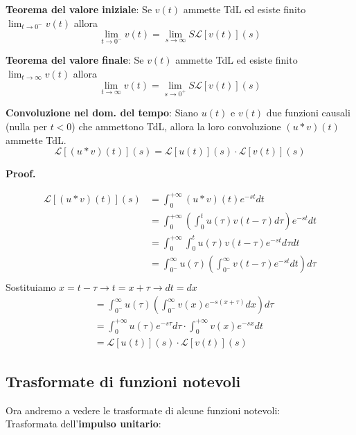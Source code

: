 \documentclass[a4paper]{article}
\newtheorem{theorem}{Theorem}[section]    %
\newtheorem{property}[theorem]{Propriety}
\theoremstyle{definition}
\theoremstyle{remark}
\renewenvironment{proof}[1][Proof]{%
  \begin{mdframed}[linewidth=0.8pt, roundcorner=5pt, linecolor=black, skipabove=\baselineskip, skipbelow=\baselineskip, innertopmargin=5pt, innerbottommargin=5pt]%
  \noindent\textbf{#1. }%
}{%
  \end{mdframed}%
}
\renewenvironment{theorem}{\begin{thmbox}\begin{oldtheorem}}{\end{oldtheorem}\end{thmbox}}
\renewenvironment{property}{\begin{oldproperty}}{\end{oldproperty}}
\begin{document}
\begin{theorem}
    \label{thm:val_iniziale_lap} \textbf{Teorema del valore iniziale}:
    Se $v(t)$ ammette TdL ed esiste finito $\lim_{t \rightarrow 0^-}v(t)$ allora 
    \[\lim_{t \rightarrow 0^-} v(t) = \lim_{s \rightarrow \infty} S\mathcal{L}[v(t)](s)\]
\end{theorem}
\begin{theorem}
    \label{thm:val_finale_lap} \textbf{Teorema del valore finale}:
    Se $v(t)$ ammette TdL ed esiste finito $\lim_{t \rightarrow \infty}v(t)$ allora 
    \[\lim_{t \rightarrow \infty} v(t) = \lim_{s \rightarrow 0^+} S\mathcal{L}[v(t)](s)\]
\end{theorem}
\begin{property}
    \textbf{Convoluzione nel dom. del tempo}: Siano $u(t)$ e $v(t)$ due funzioni causali (nulla per $t<0$) che ammettono TdL, allora la loro convoluzione $(u \ast v)(t)$ ammette TdL. 
    \[\mathcal{L}[(u \ast v)(t)](s) = \mathcal{L}[u(t)](s) \cdot \mathcal{L}[v(t)](s)\]
\end{property}
\begin{proof}
    \begin{align*}
        \mathcal{L}[(u \ast v)(t)](s) &= \int_{0}^{+\infty} (u \ast v)(t)e^{-st}dt\\
        &= \int_{0}^{+\infty} \left(\int_{0}^{t}u(\tau)v(t-\tau)d\tau\right)e^{-st}dt\\
        &= \int_{0}^{+\infty} \int_{0}^{t}u(\tau)v(t-\tau)e^{-st}d\tau dt\\
        &= \int_{0^-}^{\infty} u(\tau)\left(\int_{0^-}^{\infty} v(t-\tau)e^{-st}dt\right)d\tau\\
    \end{align*}
    Sostituiamo $x = t - \tau \rightarrow t = x + \tau \rightarrow dt = dx$ 
    \begin{align*}
        &= \int_{0^-}^{\infty} u(\tau)\left(\int_{0^-}^{\infty} v(x)e^{-s(x+\tau)}dx\right)d\tau\\ 
        &= \int_{0}^{+\infty} u(\tau)e^{-s\tau}d\tau \cdot \int_{0}^{+\infty}v(x)e^{-sx}dt\\
        &= \mathcal{L}[u(t)](s) \cdot \mathcal{L}[v(t)](s)
    \end{align*}
\end{proof}

\subsection{Trasformate di funzioni notevoli}
Ora andremo a vedere le trasformate di alcune funzioni notevoli:\\
Trasformata dell'\textbf{impulso unitario}:
\end{document}
